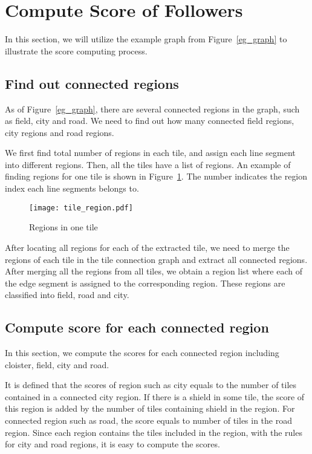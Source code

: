 \section{Compute Score of Followers}
\label{sec:score}
In this section, we will utilize the example graph from Figure~\ref{eg_graph} to illustrate the score computing process.

\subsection{Find out connected regions}
As of Figure~\ref{eg_graph}, there are several connected regions in the graph, such as field, city and road. We need to find out how many 
connected field regions, city regions and road regions. 

We first find total number of regions in each tile, and assign each line segment into different regions. Then, all the tiles have a list 
of regions. An example of finding regions for one tile is shown in Figure~\ref{tile_region}. The number indicates the region index each 
line segments belongs to.

\begin{figure}[htbp]
	  \centering
	  \texttt{[image: tile\_region.pdf]}
	  \caption{Regions in one tile}
	  \label{tile_region}
\end{figure}

After locating all regions for each of the extracted tile, we need to merge the regions of each tile in the tile connection graph and extract 
all connected regions. After merging all the regions from all tiles, we obtain a region list where each of the edge segment is assigned to 
the corresponding region. These regions are classified into field, road and city.

\subsection{Compute score for each connected region}
In this section, we compute the scores for each connected region including cloister, field, city and road. 

It is defined that the scores of region such as city equals to the number of tiles 
contained in a connected city region. If there is a shield in some tile, the score of this region is added by the number of tiles containing 
shield in the region. For connected region such as road, the score equals to number of tiles in the road region. Since each region contains the tiles included in the region, with the rules for city and road regions, it is easy to compute the scores.

